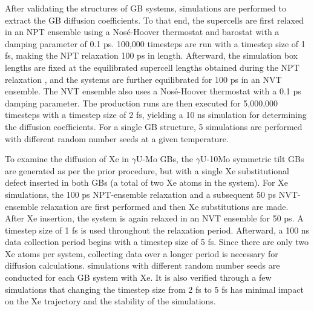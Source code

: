 \documentclass{elsarticle}
\providecommand{\DIFadd}[1]{{\protect\color{blue} \sf #1}} %
\providecommand{\DIFdel}[1]{}
\providecommand{\DIFaddbegin}{} %
\providecommand{\DIFaddend}{} %
\providecommand{\DIFdelbegin}{} %
\providecommand{\DIFdelend}{} %
\begin{document}
\DIFdelbegin \DIFdel{An initial validation study was performed to ensure the correct construction of the GBs, measured against the reproducibility of GB energies in the literature.
}\DIFdelend After validating the structures of GB systems, simulations are performed to extract the \DIFdelbegin \DIFdel{diffusion coefficients in the GBs}\DIFdelend \DIFaddbegin \DIFadd{GB diffusion coefficients}\DIFaddend . To that end, the supercells are first relaxed in an NPT ensemble using a \DIFdelbegin \DIFdel{Nose-Hoover }\DIFdelend \DIFaddbegin \DIFadd{Nos\'e-Hoover }\DIFaddend thermostat and barostat with a damping parameter of 0.1 ps. 100,000 \DIFdelbegin \DIFdel{steps are performed }\DIFdelend \DIFaddbegin \DIFadd{timesteps are run }\DIFaddend with a timestep \DIFaddbegin \DIFadd{size }\DIFaddend of 1 fs, making the NPT relaxation 100 ps in length. Afterward, the simulation box lengths are fixed at the equilibrated supercell lengths obtained during the NPT relaxation\DIFaddbegin \DIFadd{, }\DIFaddend and the systems are further equilibrated for 100 ps in an NVT ensemble. The NVT ensemble also uses a \DIFdelbegin \DIFdel{Nose-Hoover }\DIFdelend \DIFaddbegin \DIFadd{Nos\'e-Hoover }\DIFaddend thermostat with a 0.1 ps damping parameter. The production \DIFdelbegin \DIFdel{simulations }\DIFdelend \DIFaddbegin \DIFadd{runs }\DIFaddend are then executed for 5,000,000 \DIFdelbegin \DIFdel{steps }\DIFdelend \DIFaddbegin \DIFadd{timesteps }\DIFaddend with a timestep \DIFaddbegin \DIFadd{size }\DIFaddend of 2 fs, yielding a 10 ns \DIFdelbegin \DIFdel{trajectory for the determination of }\DIFdelend \DIFaddbegin \DIFadd{simulation for determining the }\DIFaddend diffusion coefficients. \DIFaddbegin \DIFadd{For a single GB structure, 5 simulations are performed with different random number seeds at a given temperature.
}\DIFaddend 

To examine the diffusion of Xe in $\gamma$U-Mo GBs, the $\gamma$U-10Mo symmetric tilt GBs are generated as per the prior procedure, but with a single Xe substitutional defect inserted in both GBs (a total of two Xe atoms in the system). For Xe simulations, the 100 ps NPT-ensemble relaxation and a subsequent 50 ps NVT-ensemble relaxation are first performed \DIFdelbegin \DIFdel{, }\DIFdelend \DIFaddbegin \DIFadd{and }\DIFaddend then Xe substitutions are made. After Xe insertion, the system is again relaxed in an NVT ensemble for 50 ps. A timestep \DIFaddbegin \DIFadd{size }\DIFaddend of 1 fs is used throughout the relaxation period. Afterward, a 100 ns data collection period begins with a timestep \DIFaddbegin \DIFadd{size }\DIFaddend of 5 fs. Since there are only two Xe atoms per system\DIFdelbegin \DIFdel{and Xe diffusion is slower than either U or Mo diffusion \cite{park2023}}\DIFdelend , collecting data over a longer period \DIFdelbegin \DIFdel{of time }\DIFdelend is necessary for diffusion calculations. \DIFaddbegin \DIFadd{5 simulations with different random number seeds are conducted for each GB system with Xe. It is also verified through a few simulations that changing the timestep size from 2 fs to 5 fs has minimal impact on the Xe trajectory and the stability of the simulations.
}\DIFaddend 
\end{document}
